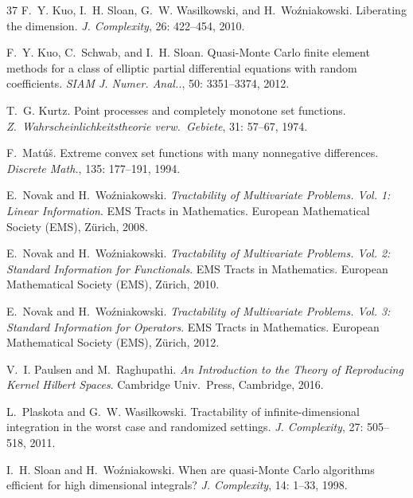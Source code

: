 \documentclass{article}
\theoremstyle{plain}
\theoremstyle{definition}
\begin{document}
\begin{thebibliography}{37}
F.~Y. Kuo, I.~H. Sloan, G.~W. Wasilkowski, and H.~Wo\'zniakowski.
\newblock Liberating the dimension.
\newblock \emph{J. Complexity}, 26: 422--454, 2010.

F.~Y. Kuo, C.~Schwab, and I.~H. Sloan.
\newblock Quasi-{M}onte {C}arlo finite element methods for a class of elliptic
  partial differential equations with random coefficients.
\newblock \emph{SIAM J. Numer. Anal..}, 50: 3351--3374, 2012.

T.~G. {Kurtz}.
\newblock Point processes and completely monotone set functions.
\newblock \emph{Z.\ Wahrscheinlichkeits\-theorie verw.\ Gebiete}, 31:
  57--67, 1974.

F.~{Mat\'u\v{s}}.
\newblock Extreme convex set functions with many nonnegative differences.
\newblock \emph{Discrete Math.}, 135: 177--191, 1994.

E.~Novak and H.~Wo\'zniakowski.
\newblock \emph{Tractability of {M}ultivariate {P}roblems. Vol. 1: {L}inear
  {I}nformation}.
\newblock EMS Tracts in Mathematics. European Mathematical Society (EMS),
  Z\"urich, 2008.

E.~Novak and H.~Wo\'zniakowski.
\newblock \emph{Tractability of {M}ultivariate {P}roblems. Vol. 2: {S}tandard
  {I}nformation for {F}unctionals}.
\newblock EMS Tracts in Mathematics. European Mathematical Society (EMS),
  Z\"urich, 2010.

E.~Novak and H.~Wo\'zniakowski.
\newblock \emph{Tractability of {M}ultivariate {P}roblems. Vol. 3: {S}tandard
  {I}nformation for {O}perators}.
\newblock EMS Tracts in Mathematics. European Mathematical Society (EMS),
  Z\"urich, 2012.

V.~I. Paulsen and M.~Raghupathi.
\newblock \emph{An Introduction to the Theory of Reproducing Kernel {H}ilbert
  Spaces}.
\newblock Cambridge Univ.\ Press, Cambridge, 2016.

L.~Plaskota and G.~W. Wasilkowski.
\newblock Tractability of infinite-dimensional integration in the worst case
  and randomized settings.
\newblock \emph{J. Complexity}, 27: 505--518, 2011.

I.~H. Sloan and H.~Wo\'{z}niakowski.
\newblock When are quasi-{M}onte {C}arlo algorithms efficient for high
  dimensional integrals?
\newblock \emph{J. Complexity}, 14: 1--33, 1998.

\end{thebibliography}
\end{document}

